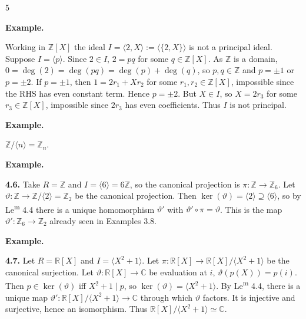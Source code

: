 \documentclass[8pt]{extarticle}
\newenvironment{example}{%
  \begin{tcolorbox}[exampleboxstyle]%
  \textbf{Example.}\ \normalfont
  \ignorespaces
}{%
  \end{tcolorbox}%
}
\begin{document}
\begin{multicols}{5}
        \begin{example}
            Working in \(\mathbb{Z}[X]\) the ideal \(I=\langle 2,X\rangle:=\langle \{2,X\}\rangle\) is not a principal ideal. Suppose \(I=\langle p\rangle\). Since \(2\in I\), \(2=pq\) for some \(q\in\mathbb{Z}[X]\). As \(\mathbb{Z}\) is a domain, \(0=\deg(2)=\deg(pq)=\deg(p)+\deg(q)\), so \(p,q\in\mathbb{Z}\) and \(p=\pm1\) or \(p=\pm2\). If \(p=\pm1\), then \(1=2r_1+Xr_2\) for some \(r_1,r_2\in\mathbb{Z}[X]\), impossible since the RHS has even constant term. Hence \(p=\pm2\). But \(X\in I\), so \(X=2r_3\) for some \(r_3\in\mathbb{Z}[X]\), impossible since \(2r_3\) has even coefficients. Thus \(I\) is not principal.
        \end{example}

        \begin{example}
            \(\mathbb{Z}/\langle n\rangle=\mathbb{Z}_n\).
        \end{example}

        \begin{example}
            \textbf{4.6.} Take \(R=\mathbb{Z}\) and \(I=\langle6\rangle=6\mathbb{Z}\), so the canonical projection is \(\pi:\mathbb{Z}\to\mathbb{Z}_6\). Let \(\vartheta:\mathbb{Z}\to\mathbb{Z}/\langle2\rangle=\mathbb{Z}_2\) be the canonical projection. Then \(\ker(\vartheta)=\langle2\rangle\supseteq\langle6\rangle\), so by Le\textsuperscript{m} 4.4 there is a unique homomorphism \(\vartheta'\) with \(\vartheta'\circ\pi=\vartheta\). This is the map \(\vartheta':\mathbb{Z}_6\to\mathbb{Z}_2\) already seen in Examples 3.8.
        \end{example}

        \begin{example}
            \textbf{4.7.} Let \(R=\mathbb{R}[X]\) and \(I=\langle X^2+1\rangle\). Let \(\pi:\mathbb{R}[X]\to\mathbb{R}[X]/\langle X^2+1\rangle\) be the canonical surjection. Let \(\vartheta:\mathbb{R}[X]\to\mathbb{C}\) be evaluation at \(i\), \(\vartheta(p(X))=p(i)\). Then \(p\in\ker(\vartheta)\) iff \(X^2+1\mid p\), so \(\ker(\vartheta)=\langle X^2+1\rangle\). By Le\textsuperscript{m} 4.4, there is a unique map \(\vartheta':\mathbb{R}[X]/\langle X^2+1\rangle\to\mathbb{C}\) through which \(\vartheta\) factors. It is injective and surjective, hence an isomorphism. Thus \(\mathbb{R}[X]/\langle X^2+1\rangle\simeq\mathbb{C}\).
        \end{example}


\end{multicols}
\end{document}
